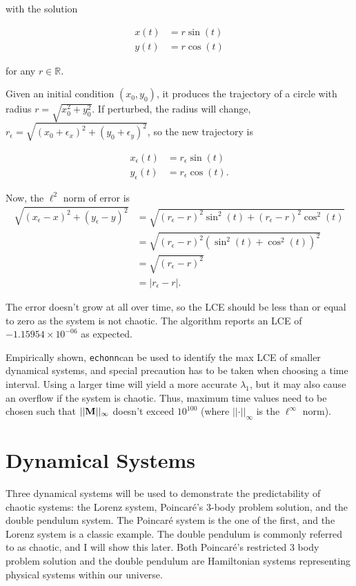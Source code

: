 \documentclass{article}
\newcommand{\echonnsp}{\texttt{echonn}\text{ }}
\begin{document}
with the solution 

\begin{align*}
    x(t) &= r\sin(t) \\
    y(t) &= r\cos(t)
\end{align*}

for any $r \in \mathbb{R}$.

Given an initial condition $(x_0, y_0)$, it produces the trajectory of a
circle with radius $r=\sqrt{x_0^2 + y_0^2}$. If perturbed, the radius will
change, $r_\epsilon=\sqrt{(x_0+\epsilon_x)^2 + (y_0+\epsilon_y)^2}$, so the
new trajectory is

\begin{align*}
    x_\epsilon(t) &= r_\epsilon\sin(t) \\
    y_\epsilon(t) &= r_\epsilon\cos(t).
\end{align*}

Now, the $\ell^2$ norm of error is 
\begin{align*}
    \sqrt{(x_\epsilon - x)^2 + (y_\epsilon - y)^2} &= \sqrt{(r_\epsilon - r)^2\sin^2(t) + (r_\epsilon - r)^2\cos^2(t)} \\
    &= \sqrt{(r_\epsilon - r)^2(\sin^2(t) + \cos^2(t))^2} \\
    &= \sqrt{(r_\epsilon - r)^2} \\
    &= \vert r_\epsilon - r \vert.
\end{align*}

The error doesn't grow at all over time, so the LCE should be less than or
equal to zero as the system is not chaotic. The algorithm reports an LCE of
$-1.15954 \times 10^{-06}$ as expected.

Empirically shown, \echonnsp can be used to identify the max LCE of smaller
dynamical systems, and special precaution has to be taken when choosing a
time interval. Using a larger time will yield a more accurate $\lambda_1$,
but it may also cause an overflow if the system is chaotic. Thus, maximum
time values need to be chosen such that $\vert \vert \mathbf{M}\vert \vert_{\infty}$
doesn't exceed $10^{100}$ (where $\vert \vert \cdot \vert \vert_{\infty}$ is
the $\ell^\infty$ norm).

\section{Dynamical Systems}

Three dynamical systems will be used to demonstrate the predictability of
chaotic systems: the Lorenz system, Poincaré's 3-body problem solution, and
the double pendulum system. The Poincaré system is the one of the first, and
the Lorenz system is a classic example. The double pendulum is commonly
referred to as chaotic, and I will show this later. Both Poincaré's
restricted 3 body problem solution and the double pendulum are Hamiltonian
systems representing physical systems within our universe.
\end{document}
